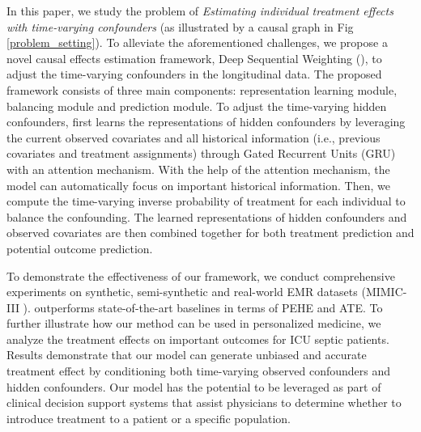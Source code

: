 In this paper, we study the problem of \textit{Estimating individual treatment effects with time-varying confounders} (as illustrated by a causal graph in Fig \ref{problem_setting}). To alleviate the aforementioned challenges, we propose a novel causal effects estimation framework, Deep Sequential Weighting (\modelnospace), to adjust the time-varying confounders in the longitudinal data. The proposed framework \model consists of three main components: representation learning module, balancing module and prediction module. To adjust the time-varying hidden confounders, \model first learns the representations of hidden confounders by leveraging the current observed covariates and all historical information (i.e., previous covariates and treatment assignments) through Gated Recurrent Units (GRU) with an attention mechanism. With the help of the attention mechanism, the model can automatically focus on important historical information. Then, we compute the time-varying inverse probability of treatment for each individual to balance the confounding. The learned representations of hidden confounders and observed covariates are then combined together for both treatment prediction and potential outcome prediction. 


To demonstrate the effectiveness of our framework, we conduct comprehensive experiments on synthetic, semi-synthetic and real-world EMR datasets (MIMIC-III \cite{johnson2016mimic}). \model outperforms state-of-the-art baselines in terms of PEHE and ATE.
To further illustrate how our method can be used in personalized medicine,  we analyze the treatment effects on important outcomes for ICU septic patients. Results demonstrate that our model can generate unbiased and accurate treatment effect by conditioning both time-varying observed confounders and hidden confounders. Our model has the potential to be leveraged as part of clinical decision support systems that assist physicians to determine whether to introduce treatment to a patient or a specific population. 


